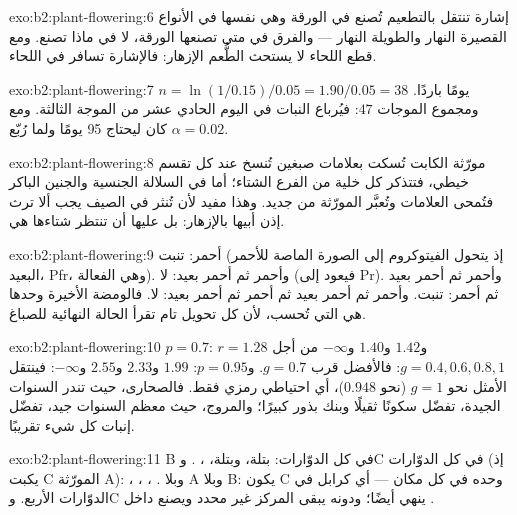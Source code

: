 \begin{solution}{exo:b2:plant-flowering:6}
 إشارة تنتقل بالتطعيم تُصنع في الورقة وهي
نفسها في الأنواع القصيرة النهار والطويلة النهار --- والفرق في متى
تصنعها الورقة، لا في ماذا تصنع. ومع قطع اللحاء
لا يستحث الطُّعم الإزهار: فالإشارة تسافر في
اللحاء.
\end{solution}

\begin{solution}{exo:b2:plant-flowering:7}
$n = \ln(1/0.15)/0.05 = 1.90/0.05 = 38$ يومًا باردًا. ومجموع الموجات
$47$: فيُرباع النبات في اليوم الحادي عشر من الموجة الثالثة.
ومع $\alpha = 0.02$ كان ليحتاج 95 يومًا ولما رُبّع.
\end{solution}

\begin{solution}{exo:b2:plant-flowering:8}
مورّثة الكابت تُسكت بعلامات صبغين تُنسخ
عند كل تقسم خيطي، فتتذكر كل خلية من الفرع الشتاء؛
أما في السلالة الجنسية والجنين الباكر فتُمحى العلامات وتُعبَّر المورّثة
من جديد. وهذا مفيد لأن  تُنثر في الصيف يجب ألا
ترث إذن أبيها بالإزهار: بل عليها أن تنتظر
شتاءها هي.
\end{solution}

\begin{solution}{exo:b2:plant-flowering:9}
أحمر: تنبت (إذ يتحول الفيتوكروم إلى الصورة الماصة للأحمر البعيد،
Pfr، وهي الفعالة). وأحمر ثم أحمر بعيد: لا (فيعود إلى Pr).
وأحمر ثم أحمر بعيد ثم أحمر: تنبت. وأحمر ثم أحمر بعيد ثم أحمر ثم أحمر بعيد: لا. فالومضة الأخيرة وحدها هي التي تُحسب،
لأن كل تحويل تام  تقرأ الحالة النهائية
للصباغ.
\end{solution}

\begin{solution}{exo:b2:plant-flowering:10}
$p = 0.7$: $r = 1.28$ و$1.42$ و$1.40$ و$-\infty$ من أجل $g = 0.4, 0.6, 0.8,
1$: فالأفضل قرب $g = 0.7$. و$p = 0.95$: $1.99$ و$2.33$ و$2.55$
و$-\infty$: فينتقل الأمثل نحو $g = 1$ (نحو $0.948$)، أي احتياطي
رمزي فقط. فالصحارى، حيث تندر السنوات الجيدة، تفضّل سكونًا ثقيلًا
وبنك بذور كبيرًا؛ والمروج، حيث معظم السنوات جيد،
تفضّل إنبات كل شيء تقريبًا.
\end{solution}

\begin{solution}{exo:b2:plant-flowering:11}
B في كل الدوّارات: بتلة، وبتلة، ، . وC في كل الدوّارات (إذ يكبت C المورّثة A): ، ، ، . وبلا A وبلا B: يكون C وحده
في كل مكان --- أي كرابل في الدوّارات الأربع. وC ينهي
 أيضًا؛ ودونه يبقى المركز غير محدد ويصنع 
داخل .
\end{solution}


